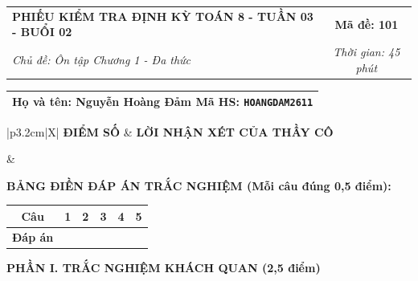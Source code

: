 \documentclass[12pt,a4paper]{article}
\begin{document}
\newpage



\noindent
\begin{tabularx}{\linewidth}{|X|c|}
\hline
\textbf{PHIẾU KIỂM TRA ĐỊNH KỲ TOÁN 8 - TUẦN 03 - BUỔI 02} & \textbf{Mã đề: 101} \\
\textit{Chủ đề: Ôn tập Chương 1 - Đa thức} & \textit{Thời gian: 45 phút} \\
\hline
\end{tabularx}

\vspace{1mm}

\noindent
\begin{tabularx}{\linewidth}{|X|}
\hline
\rule[-2mm]{0pt}{7.5mm}\textbf{Họ và tên:} \textbf{\large Nguyễn Hoàng Đảm} \hfill \textbf{Mã HS:} \texttt{HOANGDAM2611} \quad \\
\hline
\end{tabularx}

\vspace{1mm}

\noindent
\begin{tabularx}{\linewidth}{|p{3.2cm}|X|}
\hline
\centering\textbf{ĐIỂM SỐ} & \centering\textbf{LỜI NHẬN XÉT CỦA THẦY CÔ} \tabularnewline
\hline
\rule{0pt}{1.3cm} & \tabularnewline
\hline
\end{tabularx}

\vspace{1.2mm}

\noindent\textbf{BẢNG ĐIỀN ĐÁP ÁN TRẮC NGHIỆM (Mỗi câu đúng 0,5 điểm):}
\vspace{0.8mm}

\noindent
\renewcommand{\arraystretch}{1.35}
\begin{tabularx}{\linewidth}{|c|*{5}{>{\centering\arraybackslash}X|}}
\hline
\textbf{Câu} & \textbf{1} & \textbf{2} & \textbf{3} & \textbf{4} & \textbf{5} \\
\hline
\textbf{Đáp án} & & & & & \\
\hline
\end{tabularx}
\renewcommand{\arraystretch}{1.0}

\vspace{1.5mm}

\noindent\textbf{\large PHẦN I. TRẮC NGHIỆM KHÁCH QUAN (2,5 điểm)}
\vspace{1mm}
\end{document}
